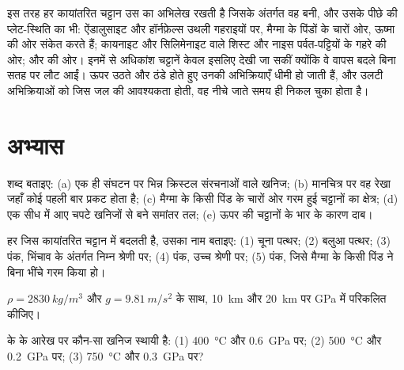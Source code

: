 इस तरह हर कायांतरित चट्टान उस  का अभिलेख रखती है जिसके अंतर्गत वह
बनी, और उसके पीछे की प्लेट-स्थिति का भी: ऐंडालुसाइट और हॉर्नफ़ेल्स
उथली गहराइयों पर, मैग्मा के पिंडों के चारों ओर, ऊष्मा की ओर संकेत करते हैं; कायनाइट और सिलिमेनाइट
वाले शिस्ट और नाइस पर्वत-पट्टियों के गहरे  की ओर;  और
  की ओर। इनमें से अधिकांश चट्टानें केवल इसलिए देखी जा सकीं
क्योंकि वे वापस बदले बिना सतह पर लौट आईं। ऊपर उठते और
ठंडे होते हुए उनकी अभिक्रियाएँ धीमी हो जाती हैं, और उलटी
अभिक्रियाओं को जिस जल की आवश्यकता होती, वह नीचे जाते समय ही निकल चुका होता है।

\section{अभ्यास}

\begin{exercise}[$\star$]\label{exo:g12:metamorphic-rocks:1}
शब्द बताइए: (a) एक ही संघटन पर भिन्न क्रिस्टल
संरचनाओं वाले खनिज; (b) मानचित्र पर वह रेखा जहाँ कोई  पहली बार प्रकट होता है;
(c) मैग्मा के किसी पिंड के चारों ओर गरम हुई चट्टानों का क्षेत्र; (d) एक सीध में आए चपटे
खनिजों से बने समांतर तल; (e) ऊपर की चट्टानों के भार के कारण
दाब।
\end{exercise}

\begin{exercise}[$\star$]\label{exo:g12:metamorphic-rocks:2}
हर  जिस कायांतरित चट्टान में बदलती है, उसका नाम बताइए: (1) चूना पत्थर;
(2) बलुआ पत्थर; (3) पंक, भिंचाव के अंतर्गत निम्न श्रेणी पर; (4) पंक, उच्च
श्रेणी पर; (5) पंक, जिसे मैग्मा के किसी पिंड ने बिना भींचे गरम किया हो।
\end{exercise}

\begin{exercise}[$\star$]\label{exo:g12:metamorphic-rocks:3}
$\rho = \qty{2830}{kg/m^3}$ और $g = \qty{9.81}{m/s^2}$ के साथ,
\qty{10}{km} और \qty{20}{km} पर  \unit{GPa} में परिकलित कीजिए।
\end{exercise}

\begin{exercise}[$\star$]\label{exo:g12:metamorphic-rocks:4}
 के  के आरेख पर कौन-सा खनिज स्थायी है:
(1) \qty{400}{\celsius} और \qty{0.6}{GPa} पर; (2) \qty{500}{\celsius}
और \qty{0.2}{GPa} पर; (3) \qty{750}{\celsius} और \qty{0.3}{GPa} पर?
\end{exercise}

